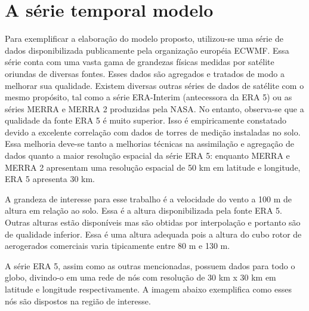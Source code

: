 \documentclass[
	12pt,				%
	openright,			%
	oneside,			%
	a4paper,			%
	english,			%
	french,				%
	spanish,			%
	brazil				%
	]{abntex2}
\begin{document}
\chapter{A série temporal modelo}\label{modelo}

Para exemplificar a elaboração do modelo proposto, utilizou-se uma série de dados disponibilizada publicamente pela organização européia ECWMF. Essa série conta com uma vasta gama de grandezas físicas medidas por satélite oriundas de diversas fontes. Esses dados são agregados e tratados de modo a melhorar sua qualidade. Existem diversas outras séries de dados de satélite com o mesmo propósito, tal como a série ERA-Interim (antecessora da ERA 5) ou as séries MERRA e MERRA 2 produzidas pela NASA. No entanto, observa-se que a qualidade da fonte ERA 5 é muito superior. Isso é empiricamente constatado devido a excelente correlação com dados de torres de medição instaladas no solo. Essa melhoria deve-se tanto a melhorias técnicas na assimilação e agregação de dados quanto a maior resolução espacial da série ERA 5: enquanto MERRA e MERRA 2 apresentam uma resolução espacial de 50 km em latitude e longitude, ERA 5 apresenta 30 km. 

A grandeza de interesse para esse trabalho é a velocidade do vento a 100 m de altura em relação ao solo. Essa é a altura disponibilizada pela fonte ERA 5. Outras alturas estão disponíveis mas são obtidas por interpolação e portanto são de qualidade inferior. Essa é uma altura adequada pois a altura do cubo rotor de aerogerados comerciais varia tipicamente entre 80 m e 130 m. 


A série ERA 5, assim como as outras mencionadas, possuem dados para todo o globo, divindo-o em uma rede de nós com resolução de 30 km x 30 km em latitude e longitude respectivamente. A imagem abaixo exemplifica como esses nós são dispostos na região de interesse. 

\end{document}
